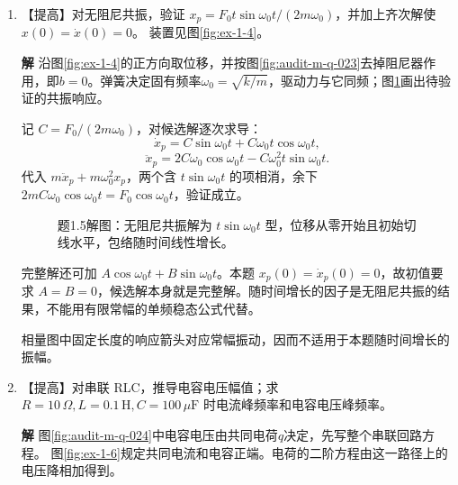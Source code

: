 \documentclass[11pt,openany,fontset=fandol]{ctexbook}
\theoremstyle{plain}\newtheorem{theorem}{定理}[chapter]\newtheorem{proposition}[theorem]{命题}
\theoremstyle{definition}\newtheorem{definition}{定义}[chapter]\newtheorem{example}{例}[chapter]
\theoremstyle{remark}\newtheorem*{remark}{说明}
\newcommand{\SolutionStart}{\par\nobreak\medskip\nobreak\noindent\textbf{解}\quad\ignorespaces}
\newenvironment{solution}{\SolutionStart}{\par\medskip}
\begin{document}
\begin{enumerate}[label=1.\arabic*]
\begin{solution}
两元件对向右运动的物块分别给出 $-kx,-b\dot x$，它们进入复刚度的不同部分；平均耗散只由阻尼器计算。
\end{solution}

\item \begin{minipage}[t]{\linewidth}
【提高】对无阻尼共振，验证 $x_p=F_0t\sin\omega_0t/(2m\omega_0)$，并加上齐次解使 $x(0)=\dot x(0)=0$。 装置见图\ref{fig:ex-1-4}。
\end{minipage}

\begin{solution}
沿图\ref{fig:ex-1-4}的正方向取位移，并按图\ref{fig:audit-m-q-023}去掉阻尼器作用，即$b=0$。弹簧决定固有频率$\omega_0=\sqrt{k/m}$，驱动力与它同频；图\ref{fig:hw-1-5}画出待验证的共振响应。

记 $C=F_0/(2m\omega_0)$，对候选解逐次求导：
\[
\dot x_p=C\sin\omega_0t+C\omega_0t\cos\omega_0t,
\]
\[
\ddot x_p=2C\omega_0\cos\omega_0t-C\omega_0^2t\sin\omega_0t.
\]
代入 $m\ddot x_p+m\omega_0^2x_p$，两个含 $t\sin\omega_0t$ 的项相消，余下 $2mC\omega_0\cos\omega_0t=F_0\cos\omega_0t$，验证成立。

\begin{figure}[H]\centering
{}
\caption{题1.5解图：无阻尼共振解为 $t\sin\omega_0t$ 型，位移从零开始且初始切线水平，包络随时间线性增长。}\label{fig:hw-1-5}
\end{figure}

完整解还可加 $A\cos\omega_0t+B\sin\omega_0t$。本题 $x_p(0)=\dot x_p(0)=0$，故初值要求 $A=B=0$，候选解本身就是完整解。随时间增长的因子是无阻尼共振的结果，不能用有限常幅的单频稳态公式代替。

相量图中固定长度的响应箭头对应常幅振动，因而不适用于本题随时间增长的振幅。
\end{solution}

\item \begin{minipage}[t]{\linewidth}
【提高】对串联 RLC，推导电容电压幅值；求 $R=10\,\Omega,L=0.1\,\mathrm H,C=100\,\mu\mathrm F$ 时电流峰频率和电容电压峰频率。

\end{minipage}

\begin{solution}
图\ref{fig:audit-m-q-024}中电容电压由共同电荷$q$决定，先写整个串联回路方程。
图\ref{fig:ex-1-6}规定共同电流和电容正端。电荷的二阶方程由这一路径上的电压降相加得到。


\end{solution}
\end{enumerate}
\end{document}
